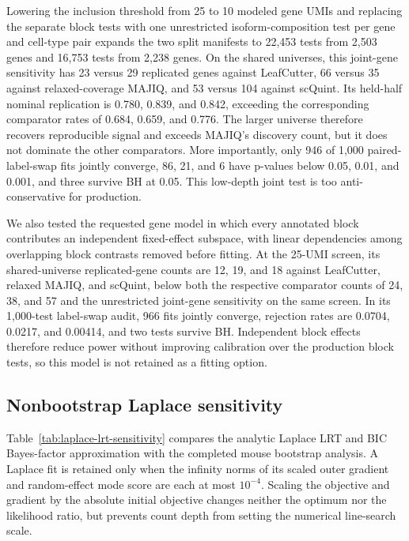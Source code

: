 \documentclass[11pt]{article}
\begin{document}
Lowering the inclusion threshold from 25 to 10 modeled gene UMIs and replacing the separate block tests with one unrestricted isoform-composition test per gene and cell-type pair expands the two split manifests to 22,453 tests from 2,503 genes and 16,753 tests from 2,238 genes. On the shared universes, this joint-gene sensitivity has 23 versus 29 replicated genes against LeafCutter, 66 versus 35 against relaxed-coverage MAJIQ, and 53 versus 104 against scQuint. Its held-half nominal replication is 0.780, 0.839, and 0.842, exceeding the corresponding comparator rates of 0.684, 0.659, and 0.776. The larger universe therefore recovers reproducible signal and exceeds MAJIQ's discovery count, but it does not dominate the other comparators. More importantly, only 946 of 1,000 paired-label-swap fits jointly converge, 86, 21, and 6 have p-values below 0.05, 0.01, and 0.001, and three survive BH at 0.05. This low-depth joint test is too anti-conservative for production.

We also tested the requested gene model in which every annotated block contributes an independent fixed-effect subspace, with linear dependencies among overlapping block contrasts removed before fitting. At the 25-UMI screen, its shared-universe replicated-gene counts are 12, 19, and 18 against LeafCutter, relaxed MAJIQ, and scQuint, below both the respective comparator counts of 24, 38, and 57 and the unrestricted joint-gene sensitivity on the same screen. In its 1,000-test label-swap audit, 966 fits jointly converge, rejection rates are 0.0704, 0.0217, and 0.00414, and two tests survive BH. Independent block effects therefore reduce power without improving calibration over the production block tests, so this model is not retained as a fitting option.

\subsection*{Nonbootstrap Laplace sensitivity}

Table~\ref{tab:laplace-lrt-sensitivity} compares the analytic Laplace LRT and BIC Bayes-factor approximation with the completed mouse bootstrap analysis. A Laplace fit is retained only when the infinity norms of its scaled outer gradient and random-effect mode score are each at most \(10^{-4}\). Scaling the objective and gradient by the absolute initial objective changes neither the optimum nor the likelihood ratio, but prevents count depth from setting the numerical line-search scale.
\end{document}
